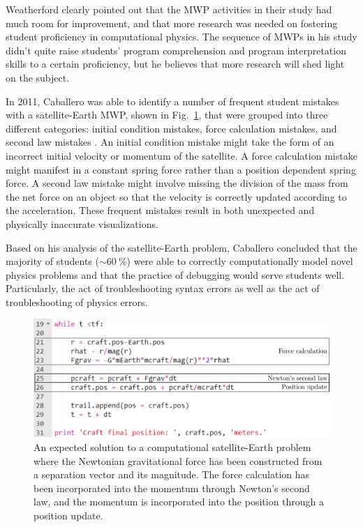 \documentclass{msuphddissertation}
\begin{document}
\begin{doublespace}
Weatherford clearly pointed out that the MWP activities in their study had much room for improvement, and that more research was needed on fostering student proficiency in computational physics.  The sequence of MWPs in his study didn't quite raise students' program comprehension and program interpretation skills to a certain proficiency, but he believes that more research will shed light on the subject.

In 2011, Caballero was able to identify a number of frequent student mistakes with a satellite-Earth MWP, shown in Fig.~\ref{CH2:Caballero}, that were grouped into three different categories: initial condition mistakes, force calculation mistakes, and second law mistakes \cite{Caballero2011}.  An initial condition mistake might take the form of an incorrect initial velocity or momentum of the satellite.  A force calculation mistake might manifest in a constant spring force rather than a position dependent spring force.  A second law mistake might involve missing the division of the mass from the net force on an object so that the velocity is correctly updated according to the acceleration.  These frequent mistakes result in both unexpected and physically inaccurate visualizations.

Based on his analysis of the satellite-Earth problem, Caballero concluded that the majority of students ($\sim\SI{60}{\percent}$) were able to correctly computationally model novel physics problems and that the practice of debugging would serve students well.  Particularly, the act of troubleshooting syntax errors as well as the act of troubleshooting of physics errors.

\begin{figure}\center
\includegraphics[scale=0.8]{images/CH2Caballero.pdf}
\caption{An expected solution to a computational satellite-Earth problem where the Newtonian gravitational force has been constructed from a separation vector and its magnitude.  The force calculation has been incorporated into the momentum through Newton's second law, and the momentum is incorporated into the position through a position update.}\label{CH2:Caballero}
\end{figure}


\end{doublespace}
\end{document}
